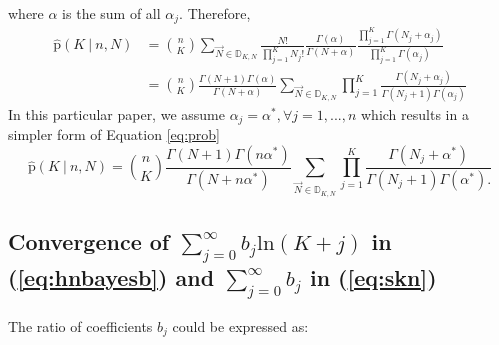 where $\alpha$ is the sum of all $\alpha_j$. Therefore,
\begin{equation} 
\label{eq:prob}
\begin{split}
\mathrm{\hat{p}}(K \: | \: n,N) & = \binom{n}{K}\sum_{\vec{N} \in \mathbb{D}_{K,N}} \frac{N!}{\prod_{j=1}^{K}N_{j}!}\frac{\Gamma(\alpha)}{\Gamma(N+\alpha)} \frac{\prod_{j=1}^{K} \Gamma({ N_{j} + \alpha_j})}{\prod_{j=1}^{K} \Gamma({\alpha_j})} \\ 
& = \binom{n}{K} \frac{\Gamma({N+1}) \Gamma(\alpha)}{\Gamma(N+\alpha)} \sum_{\vec{N} \in \mathbb{D}_{K,N}} \prod_{j=1}^{K} \frac{ \Gamma(N_{j} + \alpha_j)}{ \Gamma(N_j+1) \Gamma(\alpha_j)}
\end{split}
\end{equation}
In this particular paper, we assume $\alpha_j = \alpha^{*}, \forall j = 1,...,n$ which results in a simpler form of Equation \ref{eq:prob}
\begin{equation} 
\label{eq:probRes}
\mathrm{\hat{p}}(K \: | \: n,N) = \binom{n}{K} \frac{\Gamma({N+1}) \Gamma(n\alpha^{*})}{\Gamma(N+n\alpha^{*})} \sum_{\vec{N} \in \mathbb{D}_{K,N}} \prod_{j=1}^{K} \frac{ \Gamma(N_{j} + \alpha^{*})}{ \Gamma(N_j+1) \Gamma(\alpha^{*}).}
\end{equation}

\subsection {Convergence of $\sum_{j=0}^{\infty}{b_j \mathrm{ln}(K+j)} $ in (\ref{eq:hnbayesb}) and $\sum_{j=0}^{\infty}{b_j}$ in (\ref{eq:skn}) }
\label{subsec:conv}

The ratio of coefficients $b_j$ could be expressed as:

